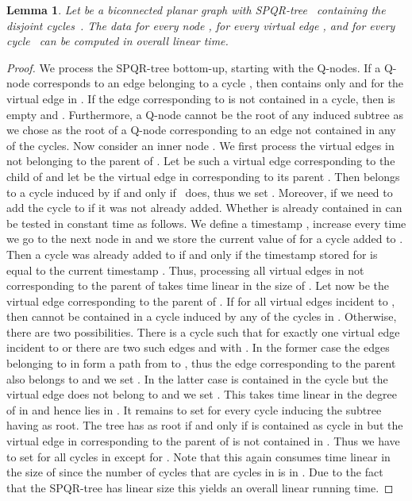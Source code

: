 \documentclass{scrartcl}
\newcommand{\1}[1]{{\normalfont \ensuremath{#1^{\tiny\circled{1}}}}} \newcommand{\2}[1]{{\normalfont \ensuremath{#1^{\tiny\circled{2}}}}} \renewcommand{\k}[1]{{\normalfont \ensuremath{#1^{\tiny\circled{k}}}}} \newcommand{\proj}[2]{\ensuremath{\left.#1\right|_{#2}}} \newcommand{\eps}{\varepsilon}
\theoremstyle{plain} \newtheorem{theorem}{Theorem} \newcounter{lemmacounter} \setcounter{lemmacounter}{0} \newtheorem{lemma}[lemmacounter]{Lemma} \newtheorem{fact}{Fact}  \newtheorem{corollary}{Corollary} \theoremstyle{definition} \newtheorem{definition}{Definition}
\begin{document}
\begin{lemma}
  \label{lem:induced-trees-comp-data}
  Let  be a biconnected planar graph with SPQR-tree~
  containing the disjoint cycles~.  The data 
  for every node ,  for every virtual edge ,
  and  for every cycle~ can be
  computed in overall linear time.
\end{lemma}
\begin{proof}
  We process the SPQR-tree  bottom-up, starting with the
  Q-nodes.  If a Q-node  corresponds to an edge belonging to a
  cycle , then  contains only  and 
  for the virtual edge in .  If the edge corresponding to 
  is not contained in a cycle, then  is empty and
  .  Furthermore, a Q-node cannot be the root of
  any induced subtree  as we chose as the root
  of  a Q-node corresponding to an edge not contained in
  any of the cycles.  Now consider an inner node .  We first
  process the virtual edges in  not belonging to the
  parent of .  Let  be such a virtual edge corresponding to
  the child  of  and let  be the virtual edge in
   corresponding to its parent .  Then 
  belongs to a cycle induced by  if and only if~ does, thus
  we set .  Moreover, if  we need to add the cycle  to  if it was
  not already added.  Whether  is already contained in
   can be tested in constant time as follows.  We define a
  timestamp , increase  every time we go to the next node in
   and we store the current value of  for a cycle added
  to .  Then a cycle  was already added to 
  if and only if the timestamp stored for  is equal to the current
  timestamp .  Thus, processing all virtual edges in 
  not corresponding to the parent of  takes time linear in the
  size of .  Let now  be the virtual edge
  corresponding to the parent of .  If  for
  all virtual edges  incident to , then  cannot be
  contained in a cycle induced by any of the cycles in .
  Otherwise, there are two possibilities.  There is a cycle  such that  for exactly one virtual
  edge  incident to  or there are two such edges 
  and  with .  In the former
  case the edges belonging to  in  form a path from 
  to , thus the edge  corresponding to the parent also
  belongs to  and we set .  In the latter case 
  is contained in the cycle  but the virtual edge does not belong
  to  and we set .  This takes time linear in
  the degree of  in  and hence lies in .  It remains to set  for every cycle  inducing the subtree 
  having  as root.  The tree  has  as
  root if and only if  is contained as cycle  in  but
  the virtual edge  in  corresponding to the parent
  of  is not contained in .  Thus we have to set
   for all cycles  in 
  except for .  Note that this again consumes time linear
  in the size of  since the number of cycles that are
  cycles in  is in .  Due to the fact
  that the SPQR-tree  has linear size this yields an
  overall linear running time.
\end{proof}
\end{document}

